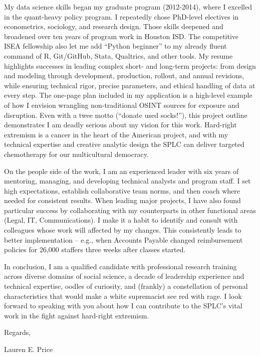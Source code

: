 \documentclass[
  11pt,
]
{article}
\begin{document}
My data science skills began my graduate program (2012-2014), where I
excelled in the quant-heavy policy program. I repeatedly chose PhD-level
electives in econometrics, sociology, and research design. Those skills
deepened and broadened over ten years of program work in Houston ISD.
The competitive ISEA fellowship also let me add ``Python beginner'' to
my already fluent command of R, Git/GitHub, Stata, Qualtrics, and other
tools. My resume highlights successes in leading complex short- and
long-term projects: from design and modeling through development,
production, rollout, and annual revisions, while ensuring technical
rigor, precise parameters, and ethical handling of data at every step.
The one-page plan included in my application is a high-level example of
how I envision wrangling non-traditional OSINT sources for exposure and
disruption. Even with a twee motto (``donate used socks!''), this
project outline demonstrates I am deadly serious about my vision for
this work. Hard-right extremism is a cancer in the heart of the American
project, and with my technical expertise and creative analytic design
the SPLC can deliver targeted chemotherapy for our multicultural
democracy.

On the people side of the work, I am an experienced leader with six
years of mentoring, managing, and developing technical analysts and
program staff. I set high expectations, establish collaborative team
norms, and then coach where needed for consistent results. When leading
major projects, I have also found particular success by collaborating
with my counterparts in other functional areas (Legal, IT,
Communications). I make it a habit to identify and consult with
colleagues whose work will affected by my changes. This consistently
leads to better implementation -- e.g., when Accounts Payable changed
reimbursement policies for 26,000 staffers three weeks after classes
started.

In conclusion, I am a qualified candidate with professional research
training across diverse domains of social science, a decade of
leadership experience and technical expertise, oodles of curiosity, and
(frankly) a constellation of personal characteristics that would make a
white supremacist see red with rage. I look forward to speaking with you
about how I can contribute to the SPLC's vital work in the fight against
hard-right extremism.

Regards,

Lauren E. Price
\end{document}
